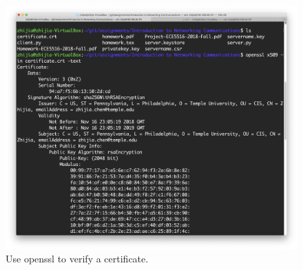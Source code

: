 \documentclass{article}
\begin{document}
\begin{figure}
    \centering
    \includegraphics[width=\linewidth]{fig/verify.png}
    \caption{Use openssl to verify a certificate.
    } \label{fig:verify}
\end{figure}
\end{document}
